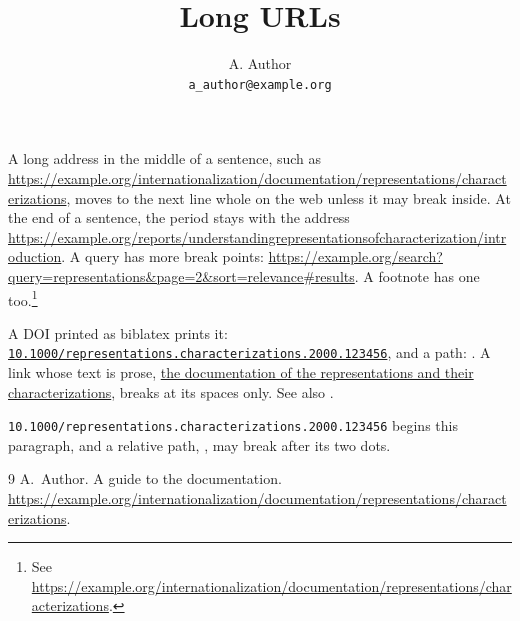 \documentclass{article}
\title{Long URLs}
\author{A. Author\\ \nolinkurl{a_author@example.org}}
\begin{document}
\maketitle
A long address in the middle of a sentence, such as
\url{https://example.org/internationalization/documentation/representations/characterizations},
moves to the next line whole on the web unless it may break inside.
At the end of a sentence, the period stays with the address
\url{https://example.org/reports/understandingrepresentationsofcharacterization/introduction}.
A query has more break points:
\url{https://example.org/search?query=representations&page=2&sort=relevance#results}.
A footnote has one too.\footnote{See
\url{https://example.org/internationalization/documentation/representations/characterizations}.}

A DOI printed as biblatex prints it:
\href{https://doi.org/10.1000/representations.characterizations.2000.123456}{\nolinkurl{10.1000/representations.characterizations.2000.123456}},
and a path: .
A link whose text is prose, \href{https://example.org/internationalization/documentation}{the documentation of the representations and their characterizations}, breaks at its spaces only.
See also \cite{guide}.

\nolinkurl{10.1000/representations.characterizations.2000.123456} begins this paragraph, and a relative path, , may break after its two dots.
\begin{thebibliography}{9}
 A.~Author. A guide to the documentation.
\url{https://example.org/internationalization/documentation/representations/characterizations}.
\end{thebibliography}
\end{document}
